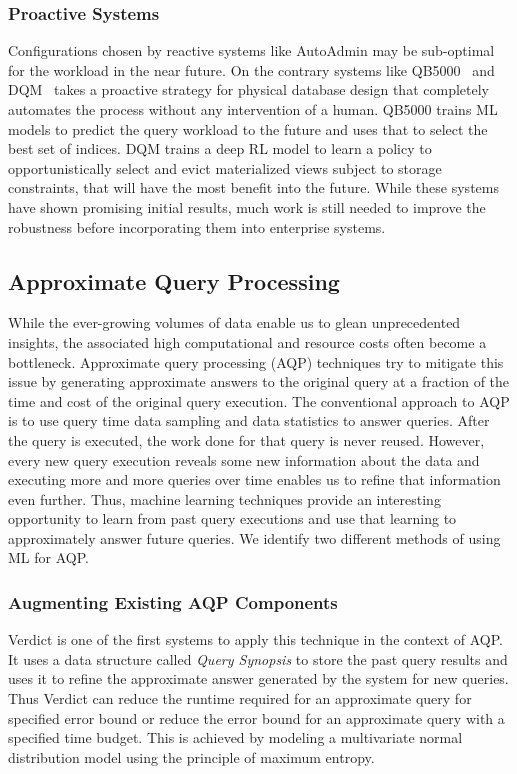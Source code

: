 \subsubsection{Proactive Systems}
Configurations chosen by reactive systems like AutoAdmin may be sub-optimal for the workload in the near future.
On the contrary systems like QB5000~\cite{qb5000} and DQM~\cite{dqm} takes a proactive strategy for physical database design that completely automates the process without any intervention of a human.
QB5000 trains ML models to predict the query workload to the future and uses that to select the best set of indices.
DQM trains a deep RL model to learn a policy to opportunistically select and evict materialized views subject to storage constraints, that will have the most benefit into the future.
While these systems have shown promising initial results, much work is still needed to improve the robustness before incorporating them into enterprise systems.

\subsection{Approximate Query Processing}
While the ever-growing volumes of data enable us to glean unprecedented insights, the associated high computational and resource costs often become a bottleneck.
Approximate query processing (AQP) techniques try to mitigate this issue by generating approximate answers to the original query at a fraction of the time and cost of the original query execution.
The conventional approach to AQP is to use query time data sampling and data statistics to answer queries.
After the query is executed, the work done for that query is never reused. However, every new query execution reveals some new information about the data and executing more and more queries over time enables us to refine that information even further.
Thus, machine learning techniques provide an interesting opportunity to learn from past query executions and use that learning to approximately answer future queries.
We identify two different methods of using ML for AQP.

\subsubsection{Augmenting Existing AQP Components}
Verdict \cite{verdict} is one of the first systems to apply this technique in the context of AQP.
It uses a data structure called \textit{Query Synopsis} to store the past query results and uses it to refine the approximate answer generated by the system for new queries.
Thus Verdict can reduce the runtime required for an approximate query for specified error bound or reduce the error bound for an approximate query with a specified time budget.
This is achieved by modeling a multivariate normal distribution model using the principle of maximum entropy.

